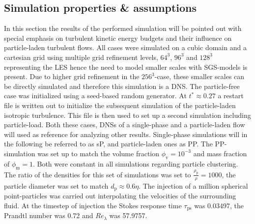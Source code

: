 \documentclass[11pt,a4paper,openany,oneside,parskip=half*]{article}
\begin{document}
\subsection{Simulation properties \& assumptions}
In this section the results of the performed simulation will be pointed out with special emphasis on turbulent kinetic energy budgets and their influence on particle-laden turbulent flows.
\newline
All cases were simulated on a cubic domain and a cartesian grid using multiple grid refinement levels, $64^3$, $96^3$ and $128^3$ representing the LES hence the need to model smaller scales with SGS-models is present. Due to higher grid refinement in the $256^3$-case, these smaller scales can be directly simulated and therefore this simulation is a DNS.
\newline
The particle-free case was initialized using a seed-based random generator. At $t^* \approx 0.27$ a restart file is written out to initialize the subsequent simulation of the particle-laden isotropic turbulence. This file is then used to set up a second simulation including particle-load. Both these cases, DNSs of a single-phase and a particle-laden flow will used as reference for analyzing other results. Single-phase simulations will in the following be referred to as sP, and particle-laden ones as PP. The PP-simulation was set up to match the volume fraction $\phi_\mathrm{v}= 10^{-3}$ and mass fraction of $\phi_\mathrm{m}=1$. Both were constant in all simulations regarding particle clustering. The ratio of the densities for this set of simulations was set to $\frac{\rho_\mathrm{p}}{\rho} = 1000$, the particle diameter was set to match $d_\mathrm{p} \approx 0.6 \eta$. The injection of a million spherical point-particles was carried out interpolating the velocities of the surrounding fluid. At the timestep of injection the Stokes response time $\tau_\mathrm{ps}$ was 0.03497, the Prandtl number was 0.72 and $Re_\lambda$ was 57.9757. 
\end{document}

